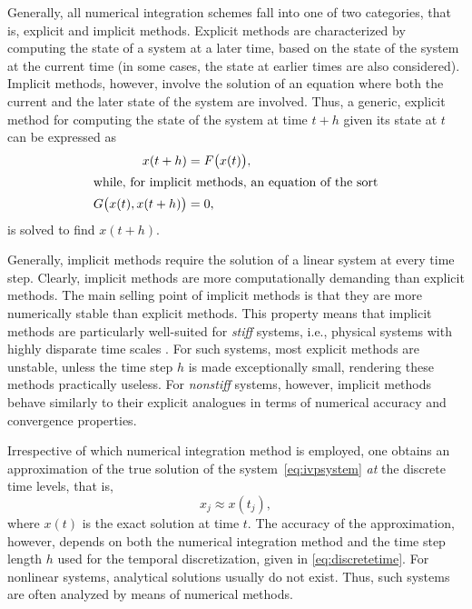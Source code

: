 Generally, all numerical integration schemes fall into one of two categories,
that is, explicit and implicit methods. Explicit methods are characterized
by computing the state of a system at a later time, based on the state of
the system at the current time (in some cases, the state at earlier times
are also considered). Implicit methods, however, involve the solution of
an equation where both the current and the later state of the system are
involved. Thus, a generic, explicit method for computing the state of the
system at time $t+h$ given its state at $t$ can be expressed as
\begin{subequations}
    \label{eq:exim}
    \begin{align}
    \label{eq:exim_ex}
    x(t+h) &= F\big(x(t)\big),\\
    \intertext{while, for implicit methods, an equation of the sort}
    \label{eq:exim_im}
    G\big(x(t),x(t+h)\big)&=0,
    \end{align}
\end{subequations}
is solved to find $x(t+h)$.

Generally, implicit methods require the solution of a linear system at every
time step. Clearly, implicit methods are more computationally demanding than
explicit methods. The main selling point of implicit methods is that they
are more numerically stable than explicit methods. This property means that
implicit methods are particularly well-suited for \emph{stiff} systems, i.e.,
physical systems with highly disparate time scales
\parencite[p.2]{hairer1996solving}. For such systems, most explicit methods
are unstable, unless the time step $h$ is made exceptionally small, rendering
these methods practically useless. For \emph{nonstiff} systems, however,
implicit methods behave similarly to their explicit analogues in terms of
numerical accuracy and convergence properties.

Irrespective of which numerical integration method is employed, one obtains
an approximation of the true solution of the system~\eqref{eq:ivpsystem}
\emph{at} the discrete time levels, that is,
\begin{equation}
    \label{eq:numericalintegratorapproximatesolution}
    x_{j} \approx x(t_{j}),
\end{equation}
where $x(t)$ is the exact solution at time $t$. The accuracy of the
approximation, however, depends on both the numerical integration method and the
time step length $h$ used for the temporal discretization, given in
\cref{eq:discretetime}. For nonlinear systems, analytical solutions usually
do not exist. Thus, such systems are often analyzed by means of numerical
methods.

